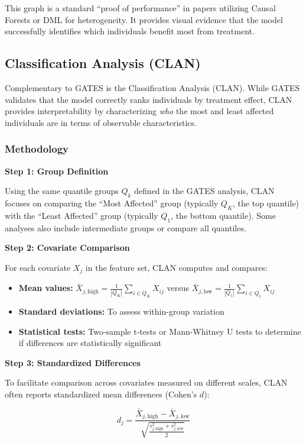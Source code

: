 \documentclass[12pt,a4paper]{article}
\begin{document}
This graph is a standard ``proof of performance'' in papers utilizing Causal Forests or DML for heterogeneity. It provides visual evidence that the model successfully identifies which individuals benefit most from treatment.

\subsection{Classification Analysis (CLAN)}

Complementary to GATES is the Classification Analysis (CLAN). While GATES validates that the model correctly ranks individuals by treatment effect, CLAN provides interpretability by characterizing \textit{who} the most and least affected individuals are in terms of observable characteristics.

\subsubsection{Methodology}

\textbf{Step 1: Group Definition}

Using the same quantile groups $Q_k$ defined in the GATES analysis, CLAN focuses on comparing the ``Most Affected'' group (typically $Q_K$, the top quantile) with the ``Least Affected'' group (typically $Q_1$, the bottom quantile). Some analyses also include intermediate groups or compare all quantiles.

\textbf{Step 2: Covariate Comparison}

For each covariate $X_j$ in the feature set, CLAN computes and compares:

\begin{itemize}
\item \textbf{Mean values:} $\bar{X}_{j,\text{high}} = \frac{1}{|Q_K|} \sum_{i \in Q_K} X_{ij}$ versus $\bar{X}_{j,\text{low}} = \frac{1}{|Q_1|} \sum_{i \in Q_1} X_{ij}$
\item \textbf{Standard deviations:} To assess within-group variation
\item \textbf{Statistical tests:} Two-sample t-tests or Mann-Whitney U tests to determine if differences are statistically significant
\end{itemize}

\textbf{Step 3: Standardized Differences}

To facilitate comparison across covariates measured on different scales, CLAN often reports standardized mean differences (Cohen's $d$):

\begin{equation}
d_j = \frac{\bar{X}_{j,\text{high}} - \bar{X}_{j,\text{low}}}{\sqrt{\frac{s^2_{j,\text{high}} + s^2_{j,\text{low}}}{2}}}
\end{equation}
\end{document}
